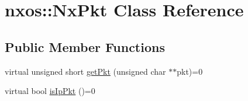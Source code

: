 \hypertarget{classnxos_1_1NxPkt}{\section{nxos\-:\-:Nx\-Pkt Class Reference}
\label{classnxos_1_1NxPkt}
}
\subsection*{Public Member Functions}
\begin{DoxyCompactItemize}
\item 
virtual unsigned short \hyperlink{classnxos_1_1NxPkt_af3c01a1791efb72c3aa57878d55e9522}{get\-Pkt} (unsigned char $\ast$$\ast$pkt)=0
\item 
\hypertarget{classnxos_1_1NxPkt_a9b75d1f03831f10efcb48848e238e36f}{virtual bool \hyperlink{classnxos_1_1NxPkt_a9b75d1f03831f10efcb48848e238e36f}{is\-Ip\-Pkt} ()=0}\label{classnxos_1_1NxPkt_a9b75d1f03831f10efcb48848e238e36f}


\end{DoxyCompactItemize}
